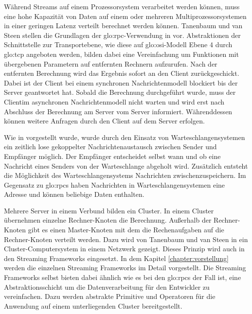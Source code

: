 
Während Streams auf einem Prozessorsystem verarbeitet werden können, muss eine hohe Kapazität von Daten auf einem oder mehreren Multiprozessorsystemen in einer geringen Latenz verteilt berechnet werden können. Tanenbaum und van Steen stellen die Grundlagen der \gls{glo:rpc}-Verwendung in  vor. Abstraktionen der Schnittstelle zur Transportebene, wie diese auf \acrshort{glo:osi}-Modell Ebene 4 durch \gls{glo:tcp} angeboten werden, bilden dabei eine Vereinfachung um Funktionen mit übergebenen Parametern auf entfernten Rechnern aufzurufen. Nach der entfernten Berechnung wird das Ergebnis sofort an den Client zurückgeschickt. Dabei ist der Client bei einem synchronen Nachrichtenmodell blockiert bis der Server geantwortet hat. Sobald die Berechnung durchgeführt wurde, muss der Clientim asynchronen Nachrichtenmodell nicht warten und wird erst nach Abschluss der Berechnung am Server vom Server informiert. Währenddessen können weitere Anfragen durch den Client auf dem Server erfolgen. 

Wie in  vorgestellt wurde, wurde durch den Einsatz von Warteschlangensystemen ein zeitlich lose gekoppelter Nachrichtenaustausch zwischen Sender und Empfänger möglich. Der Empfänger entscheidet selbst wann und ob eine Nachricht eines Senders von der Warteschlange abgeholt wird. Zusätzlich entsteht die Möglichkeit des Warteschlangensystems Nachrichten zwischenzuspeichern. Im Gegensatz zu \glspl{glo:rpc} haben Nachrichten in Warteschlangensystemen eine Adresse und können beliebige Daten enthalten. 

Mehrere Server in einem Verbund bilden ein Cluster. In einem Cluster übernehmen einzelne Rechner-Knoten die Berechnung. Außerhalb der Rechner-Knoten gibt es einen Master-Knoten mit dem die Rechenaufgaben auf die Rechner-Knoten verteilt werden. Dazu wird von Tanenbaum und van Steen in  ein Cluster-Computersystem in einem Netzwerk gezeigt. Dieses Prinzip wird auch in den Streaming Frameworks eingesetzt. In dem Kapitel \ref{chapter:vorstellung} werden die einzelnen Streaming Frameworks im Detail vorgestellt. Die Streaming Frameworks selbst bieten dabei ähnlich wie es bei den \glspl{glo:rpc} der Fall ist, eine Abstraktionsschicht um die Datenverarbeitung für den Entwickler zu vereinfachen. Dazu werden abstrakte Primitive und Operatoren für die Anwendung auf einem unterliegenden Cluster bereitgestellt.

